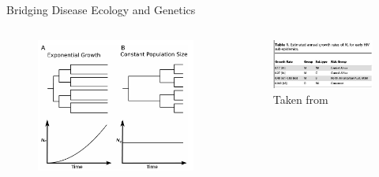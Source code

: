 \begin{frame}{Bridging Disease Ecology and Genetics}
\begin{columns}
\column{2.5in}
\begin{figure}
  \includegraphics[scale=0.35]{FIGURES/pop_growth.jpg}
\end{figure}
\column{2.5in}
\begin{figure}
  \includegraphics[scale=0.45]{FIGURES/hiv_growth.jpg}
  \caption{Taken from~\cite{volz2013}}
\end{figure}
\end{columns}
\end{frame}
